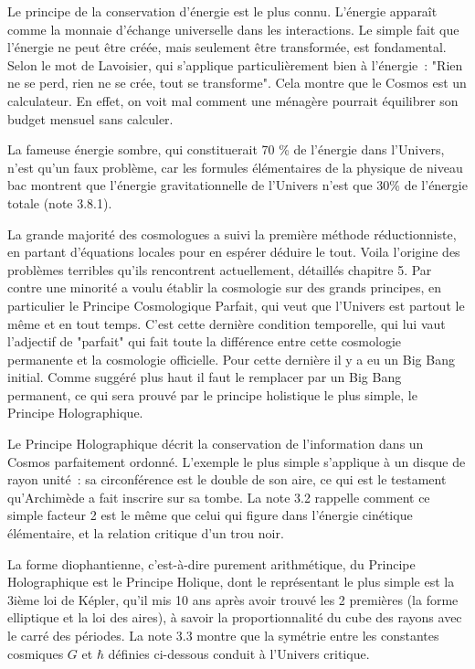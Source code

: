 \documentclass[a4paper,12pt]{article}
\begin{document}
Le principe de la conservation d'énergie est le plus connu. L'énergie apparaît comme la monnaie d'échange universelle dans les interactions. Le simple fait que l'énergie ne peut être créée, mais seulement être transformée, est fondamental. Selon le mot de Lavoisier, qui s'applique particulièrement bien à l'énergie : "Rien ne se perd, rien ne se crée, tout se transforme". Cela montre que le Cosmos est un calculateur.  En effet, on voit mal comment une ménagère pourrait équilibrer son budget mensuel sans calculer.

La fameuse énergie sombre, qui constituerait 70 \% de l'énergie dans l'Univers, n'est qu'un faux problème, car les formules élémentaires de la physique de niveau bac montrent que l'énergie gravitationnelle de l'Univers n'est que 30\% de l'énergie totale (note 3.8.1). 

La grande majorité des cosmologues a suivi la première méthode réductionniste, en partant d'équations locales pour en espérer déduire le tout. Voila l'origine des problèmes terribles qu'ils rencontrent actuellement, détaillés chapitre 5. Par contre une minorité a voulu établir la cosmologie sur des grands principes, en particulier le Principe Cosmologique Parfait, qui veut que l'Univers est partout le même et en tout temps. C'est cette dernière condition temporelle, qui lui vaut l'adjectif de "parfait" qui fait toute la différence entre cette cosmologie permanente et la cosmologie officielle. Pour cette dernière il y a eu un Big Bang initial. Comme suggéré plus haut il faut le remplacer par un Big Bang permanent, ce qui sera prouvé par le principe holistique le plus simple, le Principe Holographique.

 Le Principe Holographique décrit la conservation de l'information dans un Cosmos parfaitement ordonné. L'exemple le plus simple s'applique à un disque de rayon unité : sa circonférence est le double de son aire, ce qui est le testament qu'Archimède a fait inscrire sur sa tombe. La note 3.2 rappelle comment ce simple facteur 2 est le même que celui qui figure dans l'énergie cinétique élémentaire, et la relation critique d'un trou noir.

La forme diophantienne, c'est-à-dire purement arithmétique, du Principe Holographique est le Principe Holique, dont le représentant le plus simple est la 3ième loi de Képler, qu'il mis 10 ans après avoir trouvé les 2 premières (la forme elliptique et la loi des aires), à savoir la proportionnalité du cube des rayons avec le carré des périodes. La note 3.3 montre que la symétrie entre les constantes cosmiques $G$ et $\hbar$ définies ci-dessous conduit à l'Univers critique.
\end{document}
